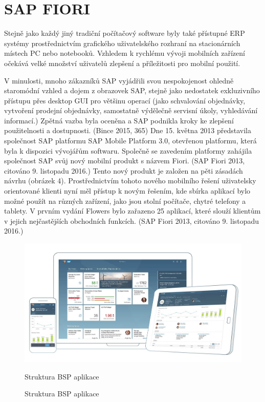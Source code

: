 \documentclass[thesis=M,czech]{FITthesis}[2012/06/26]
\begin{document}
\section{SAP FIORI}

Stejně jako každý jiný tradiční počítačový software byly také přístupné ERP systémy prostřednictvím grafického uživatelského rozhraní na stacionárních místech PC nebo notebooků. Vzhledem k rychlému vývoji mobilních zařízení očekává velké množství uživatelů zlepšení a příležitosti pro mobilní použití.

V minulosti, mnoho zákazníků SAP vyjádřili svou nespokojenost ohledně staromódní vzhled a dojem z obrazovek SAP, stejně jako nedostatek exkluzivního přístupu přes desktop GUI pro většinu operací (jako schvalování objednávky, vytvoření prodejní objednávky, samostatně výdělečně servisní úkoly, vyhledávání informací.) Zpětná vazba byla oceněna a SAP podnikla kroky ke zlepšení použitelnosti a dostupnosti. (Bince 2015, 365)
Dne 15. května 2013 představila společnost SAP platformu SAP Mobile Platform 3.0, otevřenou platformu, která byla k dispozici vývojářům softwaru. Společně se zavedením platformy zahájila společnost SAP svůj nový mobilní produkt s názvem Fiori. (SAP Fiori 2013, citováno 9. listopadu 2016.) Tento nový produkt je založen na pěti zásadách návrhu (obrázek 4).
Prostřednictvím tohoto nového mobilního řešení uživatelsky orientované klienti nyní měl přístup k novým řešením, kde sbírka aplikací bylo možné použít na různých zařízení, jako jsou stolní počítače, chytré telefony a tablety. V prvním vydání Flowers bylo zařazeno 25 aplikací, které slouží klientům v jejich nejčastějších obchodních funkcích. (SAP Fiori 2013, citováno 9. listopadu 2016.)


\begin{figure}[H]
	\centering
	\includegraphics[width=1\textwidth]{images/fiori.jpg}
	\caption{Struktura BSP aplikace}
	\label{img:fiori}
	\small
	Struktura BSP aplikace
\end{figure}
\end{document}
